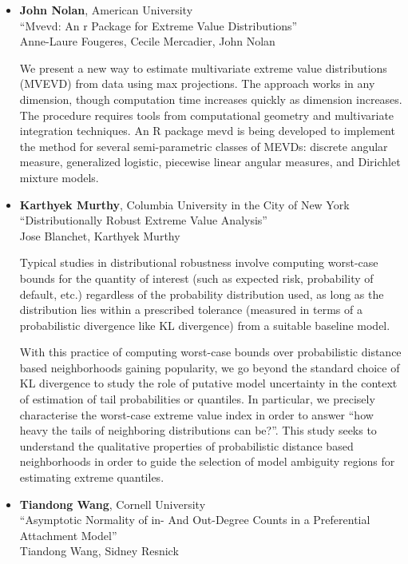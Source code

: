 \begin{itemize}
\item \textbf{John Nolan}, American University \\
``Mvevd: An r Package for Extreme Value Distributions'' \\
Anne-Laure Fougeres, Cecile Mercadier, John Nolan


We present a new way to estimate multivariate extreme value distributions (MVEVD) from data using max projections.
The approach works in any dimension, though computation time increases quickly as dimension increases.
The procedure requires tools from computational geometry and multivariate integration techniques.
An R package mevd is being developed to implement the method for several semi-parametric classes of MEVDs:
discrete angular measure, generalized logistic, piecewise linear angular measures, and Dirichlet mixture models.

\item \textbf{Karthyek Murthy}, Columbia University in the City of New York \\
``Distributionally Robust Extreme Value Analysis'' \\
Jose Blanchet, Karthyek Murthy


Typical studies in distributional robustness involve computing worst-case bounds for the quantity of interest (such as expected risk, probability of default, etc.) regardless of the probability distribution used, as long as the distribution lies within a prescribed tolerance (measured in terms of a probabilistic divergence like KL divergence) from a suitable baseline model. 

With this practice of computing worst-case bounds over probabilistic distance based neighborhoods gaining popularity, we go beyond the standard choice of KL divergence to study the role of putative model uncertainty in the context of estimation of tail probabilities or quantiles. In particular, we precisely   characterise  the worst-case extreme value index in order to answer “how heavy the tails of neighboring distributions can be?”. This study seeks to understand the qualitative properties of probabilistic distance based neighborhoods in order to guide the selection of model ambiguity regions for estimating extreme quantiles.  

\item \textbf{Tiandong Wang}, Cornell University \\
``Asymptotic Normality of in- And Out-Degree Counts in a Preferential Attachment Model'' \\
Tiandong Wang, Sidney Resnick



\end{itemize}
